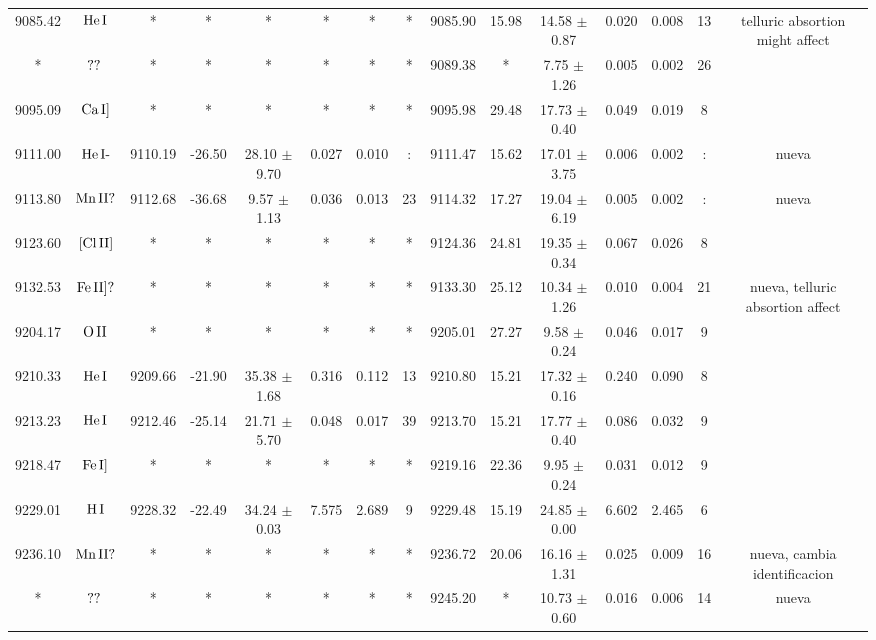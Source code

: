\documentclass{article}
\begin{document}
\begin{table*}
\begin{adjustbox}{width=\textwidth}
\begin{tabular}{ccccccccccccccc}
9085.42 & $\mbox{He}\thinspace \mbox{I}$ & * & * & * & * & * & * & 9085.90 & 15.98 & 14.58 $\pm$ 0.87 & 0.020 & 0.008 & 13 &  telluric absortion might affect \\
* & $\mbox{??}\thinspace \mbox{}$ & * & * & * & * & * & * & 9089.38 & * & 7.75 $\pm$ 1.26 & 0.005 & 0.002 & 26 &  \\
9095.09 & $\mbox{Ca}\thinspace \mbox{I]}$ & * & * & * & * & * & * & 9095.98 & 29.48 & 17.73 $\pm$ 0.40 & 0.049 & 0.019 & 8 &  \\
9111.00 & $\mbox{He}\thinspace \mbox{I-}$ & 9110.19 & -26.50 & 28.10 $\pm$ 9.70 & 0.027 & 0.010 & : & 9111.47 & 15.62 & 17.01 $\pm$ 3.75 & 0.006 & 0.002 & : &  nueva \\
9113.80 & $\mbox{Mn}\thinspace \mbox{II?}$ & 9112.68 & -36.68 & 9.57 $\pm$ 1.13 & 0.036 & 0.013 & 23 & 9114.32 & 17.27 & 19.04 $\pm$ 6.19 & 0.005 & 0.002 & : &  nueva \\
9123.60 & $\mbox{[Cl}\thinspace \mbox{II]}$ & * & * & * & * & * & * & 9124.36 & 24.81 & 19.35 $\pm$ 0.34 & 0.067 & 0.026 & 8 &  \\
9132.53 & $\mbox{Fe}\thinspace \mbox{II]?}$ & * & * & * & * & * & * & 9133.30 & 25.12 & 10.34 $\pm$ 1.26 & 0.010 & 0.004 & 21 &  nueva, telluric absortion affect \\
9204.17 & $\mbox{O}\thinspace \mbox{II}$ & * & * & * & * & * & * & 9205.01 & 27.27 & 9.58 $\pm$ 0.24 & 0.046 & 0.017 & 9 &  \\
9210.33 & $\mbox{He}\thinspace \mbox{I}$ & 9209.66 & -21.90 & 35.38 $\pm$ 1.68 & 0.316 & 0.112 & 13 & 9210.80 & 15.21 & 17.32 $\pm$ 0.16 & 0.240 & 0.090 & 8 &  \\
9213.23 & $\mbox{He}\thinspace \mbox{I}$ & 9212.46 & -25.14 & 21.71 $\pm$ 5.70 & 0.048 & 0.017 & 39 & 9213.70 & 15.21 & 17.77 $\pm$ 0.40 & 0.086 & 0.032 & 9 &  \\
9218.47 & $\mbox{Fe}\thinspace \mbox{I]}$ & * & * & * & * & * & * & 9219.16 & 22.36 & 9.95 $\pm$ 0.24 & 0.031 & 0.012 & 9 &  \\
9229.01 & $\mbox{H}\thinspace \mbox{I}$ & 9228.32 & -22.49 & 34.24 $\pm$ 0.03 & 7.575 & 2.689 & 9 & 9229.48 & 15.19 & 24.85 $\pm$ 0.00 & 6.602 & 2.465 & 6 &  \\
9236.10 & $\mbox{Mn}\thinspace \mbox{II?}$ & * & * & * & * & * & * & 9236.72 & 20.06 & 16.16 $\pm$ 1.31 & 0.025 & 0.009 & 16 &  nueva, cambia identificacion \\
* & $\mbox{??}\thinspace \mbox{}$ & * & * & * & * & * & * & 9245.20 & * & 10.73 $\pm$ 0.60 & 0.016 & 0.006 & 14 &  nueva \\

\end{tabular}
\end{adjustbox}
\end{table*}
\end{document}
